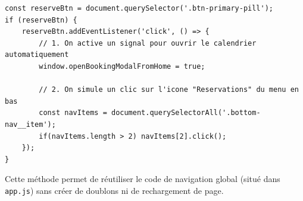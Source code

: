 \date{}\documentclass[12pt,a4paper]{article}
\begin{document}
\begin{lstlisting}[caption={Exemple de navigation simulee vers les reservations}]
const reserveBtn = document.querySelector('.btn-primary-pill');
if (reserveBtn) {
    reserveBtn.addEventListener('click', () => {
        // 1. On active un signal pour ouvrir le calendrier automatiquement
        window.openBookingModalFromHome = true;

        // 2. On simule un clic sur l'icone "Reservations" du menu en bas
        const navItems = document.querySelectorAll('.bottom-nav__item');
        if(navItems.length > 2) navItems[2].click();
    });
}
\end{lstlisting}
Cette méthode permet de réutiliser le code de navigation global (situé dans \texttt{app.js}) sans créer de doublons ni de rechargement de page.
\end{document}

